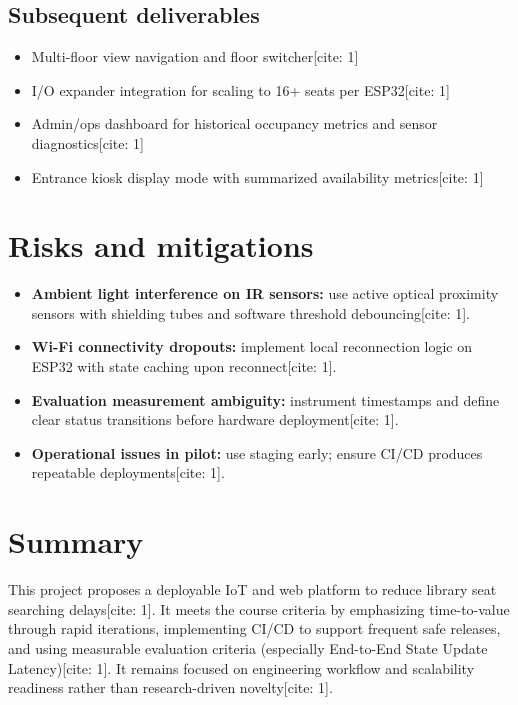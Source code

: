 \documentclass[11pt,a4paper]{article}
\begin{document}
\subsection{Subsequent deliverables}
\begin{itemize}[leftmargin=0.7cm]
    \item Multi-floor view navigation and floor switcher[cite: 1]
    \item I/O expander integration for scaling to 16+ seats per ESP32[cite: 1]
    \item Admin/ops dashboard for historical occupancy metrics and sensor diagnostics[cite: 1]
    \item Entrance kiosk display mode with summarized availability metrics[cite: 1]
\end{itemize}

\section{Risks and mitigations}
\begin{itemize}[leftmargin=0.7cm]
    \item \textbf{Ambient light interference on IR sensors:} use active optical proximity sensors with shielding tubes and software threshold debouncing[cite: 1].
    \item \textbf{Wi-Fi connectivity dropouts:} implement local reconnection logic on ESP32 with state caching upon reconnect[cite: 1].
    \item \textbf{Evaluation measurement ambiguity:} instrument timestamps and define clear status transitions before hardware deployment[cite: 1].
    \item \textbf{Operational issues in pilot:} use staging early; ensure CI/CD produces repeatable deployments[cite: 1].
\end{itemize}

\section{Summary}
This project proposes a deployable IoT and web platform to reduce library seat searching delays[cite: 1]. It meets the course criteria by emphasizing time-to-value through rapid iterations, implementing CI/CD to support frequent safe releases, and using measurable evaluation criteria (especially End-to-End State Update Latency)[cite: 1]. It remains focused on engineering workflow and scalability readiness rather than research-driven novelty[cite: 1].
\end{document}
